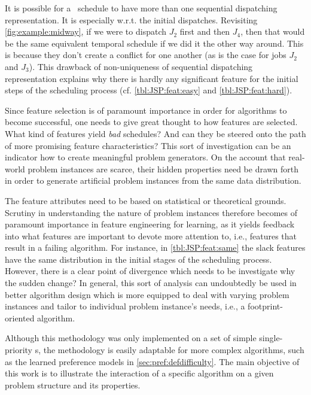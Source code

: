 It is possible for a \JSP\ schedule to have more than one sequential 
dispatching representation. It is especially w.r.t. the initial dispatches. 
Revisiting \cref{fig:example:midway}, if we were to dispatch $J_2$ 
first and then $J_4$, then that would be the same equivalent
temporal schedule if we did it the other way around. 
This is because they don't create a conflict for one another 
(as is the case for jobs $J_2$ and $J_3$). This drawback of non-uniqueness of 
sequential dispatching representation explains why there is hardly any 
significant feature for the initial steps of the scheduling process (cf. 
\cref{tbl:JSP:feat:easy} and \cref{tbl:JSP:feat:hard}). 

Since feature selection is of paramount importance in order for algorithms to 
become successful, one needs to give great thought to how features are 
selected. What kind of features yield \emph{bad} schedules? And can they be 
steered onto the path of more promising feature characteristics? This sort of 
investigation can be an indicator how to create meaningful problem generators. 
On the account that real-world problem instances are scarce, their hidden 
properties need be drawn forth in order to generate artificial problem 
instances from the same data distribution. 

The feature attributes need to be based on statistical or theoretical grounds. 
Scrutiny in understanding the nature of problem instances therefore becomes of 
paramount importance in feature engineering for learning, as it yields feedback 
into what features are important to devote more attention to, i.e., features 
that result in a failing algorithm. 
For instance, in \cref{tbl:JSP:feat:same} the slack features have the same 
distribution in the initial stages of the scheduling process. However, there is 
a clear point of divergence which needs to be investigate why the sudden 
change? 
In general, this sort of analysis can undoubtedly be used in better 
algorithm design which is more equipped to deal with varying problem instances 
and tailor to individual problem instance's needs, i.e., a footprint-oriented 
algorithm.

Although this methodology was only implemented on a set of simple 
single-priority \dr s, the methodology is easily adaptable for more 
complex algorithms, such as the learned preference models in 
\cref{sec:pref:defdifficulty}. The main objective of this work is to 
illustrate the interaction of a specific algorithm on a given problem structure 
and its properties. 